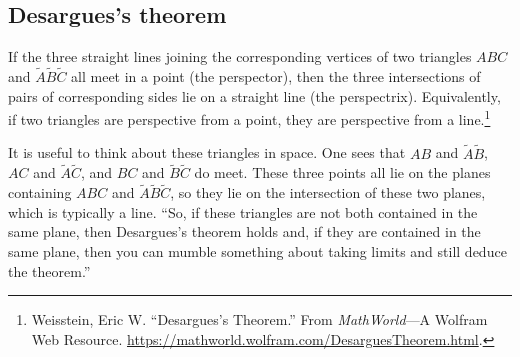 \documentclass [11 pt, oneside, margin = 1 in] {article}
\begin{document}
\subsection{Desargues's theorem}
\begin{theorem}[Desargues]\label{}\text{}
If the three straight lines joining the corresponding vertices of two triangles $ABC$ and $\tilde A\tilde B\tilde C$ all meet in a point (the perspector), then the three intersections of pairs of corresponding sides lie on a straight line (the perspectrix). Equivalently, if two triangles are perspective from a point, they are perspective from a line.\footnote{Weisstein, Eric W. ``Desargues's Theorem.'' From \textsl{MathWorld}---A Wolfram Web Resource. \url{https://mathworld.wolfram.com/DesarguesTheorem.html}.}
\end{theorem}

It is useful to think about these triangles in space. One sees that $AB$ and $\tilde A\tilde B$, $AC$ and $\tilde A\tilde C$, and $BC$ and $\tilde B\tilde C$ do meet. These three points all lie on the planes containing $ABC$ and $\tilde A\tilde B\tilde C$, so they lie on the intersection of these two planes, which is typically a line. ``So, if these triangles are not both contained in the same plane, then Desargues's theorem holds and, if they are contained in the same plane, then you can mumble something about taking limits and still deduce the theorem.''
\end{document}
